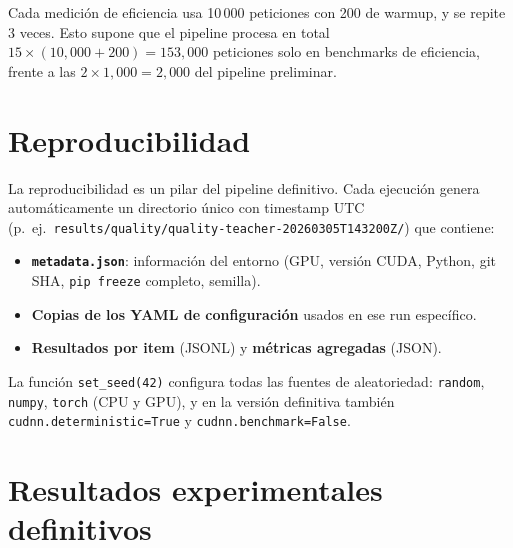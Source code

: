 \documentclass[11pt,a4paper]{article}
\begin{document}
Cada medici\'on de eficiencia usa 10\,000 peticiones con 200 de warmup,
y se repite 3 veces. Esto supone que el pipeline procesa en total
$15 \times (10{,}000 + 200) = 153{,}000$ peticiones solo en benchmarks
de eficiencia, frente a las $2 \times 1{,}000 = 2{,}000$ del pipeline
preliminar.


\section{Reproducibilidad}
\label{sec:reproducibility}

La reproducibilidad es un pilar del pipeline definitivo. Cada
ejecuci\'on genera autom\'aticamente un directorio \'unico con
timestamp UTC (p.~ej.\
\texttt{results/quality/quality-teacher-20260305T143200Z/}) que contiene:

\begin{itemize}
  \item \textbf{\texttt{metadata.json}}: informaci\'on del entorno
    (GPU, versi\'on CUDA, Python, git SHA, \texttt{pip freeze}
    completo, semilla).
  \item \textbf{Copias de los YAML de configuraci\'on} usados en ese
    run espec\'ifico.
  \item \textbf{Resultados por item} (JSONL) y \textbf{m\'etricas
    agregadas} (JSON).
\end{itemize}

La funci\'on \texttt{set\_seed(42)} configura todas las fuentes de
aleatoriedad: \texttt{random}, \texttt{numpy}, \texttt{torch} (CPU y
GPU), y en la versi\'on definitiva tambi\'en
\texttt{cudnn.deterministic=True} y \texttt{cudnn.benchmark=False}.

\section{Resultados experimentales definitivos}
\label{sec:results}
\end{document}
